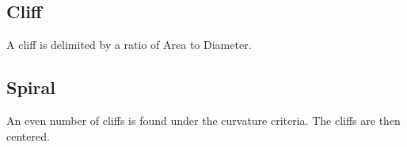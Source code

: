\documentclass{article}
\begin{document}
\subsection{Cliff}
A cliff is delimited by a ratio of Area to Diameter.

\subsection{Spiral}
An even number of cliffs is found under the curvature criteria.
The cliffs are then centered.


\iffalse
\begin{equation} 
\forall u,v \in V :
d(u,v) = 
\begin{cases}
0,  u=v \\
1,  u \neq v 
\end{cases}
\end{equation}
\fi

\printbibliography
\end{document}

